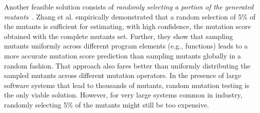 Another feasible solution consists of  \emph{randomly selecting a portion of the generated mutants}~\cite{zhang2010operator,gopinath2015hard,zhang2013operator}. 
%
%
% 
Zhang et al. \cite{zhang2013operator} empirically demonstrated that a random selection of 5\% of the mutants is sufficient for 
estimating, with high confidence, the mutation score obtained with the complete mutants set.
Further,
they show that sampling mutants uniformly across different program elements (e.g., functions) %
leads to a more accurate mutation score prediction than sampling mutants globally in a random fashion. That approach also fares better than uniformly distributing the sampled mutants across different mutation operators. In the presence of large software systems that lead to thousands of mutants, random mutation testing is the only viable solution. However, for very large systems common in industry, randomly selecting 5\% of the mutants might still be too expensive.

